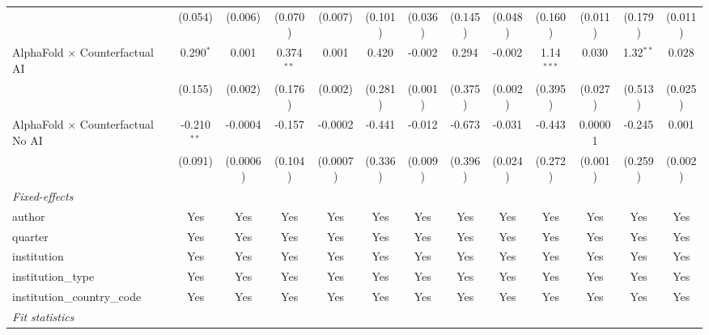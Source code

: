 \begin{tabular}{lcccccccccccc}
                                            & (0.054)       & (0.006)  & (0.070)      & (0.007)  & (0.101)      & (0.036)      & (0.145)     & (0.048)      & (0.160)      & (0.011) & (0.179)     & (0.011)\\   
   AlphaFold $\times$ Counterfactual AI     & 0.290$^{*}$   & 0.001    & 0.374$^{**}$ & 0.001    & 0.420        & -0.002       & 0.294       & -0.002       & 1.14$^{***}$ & 0.030   & 1.32$^{**}$ & 0.028\\   
                                            & (0.155)       & (0.002)  & (0.176)      & (0.002)  & (0.281)      & (0.001)      & (0.375)     & (0.002)      & (0.395)      & (0.027) & (0.513)     & (0.025)\\   
   AlphaFold $\times$ Counterfactual No AI  & -0.210$^{**}$ & -0.0004  & -0.157       & -0.0002  & -0.441       & -0.012       & -0.673      & -0.031       & -0.443       & 0.00001 & -0.245      & 0.001\\   
                                            & (0.091)       & (0.0006) & (0.104)      & (0.0007) & (0.336)      & (0.009)      & (0.396)     & (0.024)      & (0.272)      & (0.001) & (0.259)     & (0.002)\\   
   \midrule
   \emph{Fixed-effects}\\
   author                                   & Yes           & Yes      & Yes          & Yes      & Yes          & Yes          & Yes         & Yes          & Yes          & Yes     & Yes         & Yes\\  
   quarter                                  & Yes           & Yes      & Yes          & Yes      & Yes          & Yes          & Yes         & Yes          & Yes          & Yes     & Yes         & Yes\\  
   institution                              & Yes           & Yes      & Yes          & Yes      & Yes          & Yes          & Yes         & Yes          & Yes          & Yes     & Yes         & Yes\\  
   institution\_type                        & Yes           & Yes      & Yes          & Yes      & Yes          & Yes          & Yes         & Yes          & Yes          & Yes     & Yes         & Yes\\  
   institution\_country\_code               & Yes           & Yes      & Yes          & Yes      & Yes          & Yes          & Yes         & Yes          & Yes          & Yes     & Yes         & Yes\\  
   \midrule
   \emph{Fit statistics}\\

\end{tabular}
